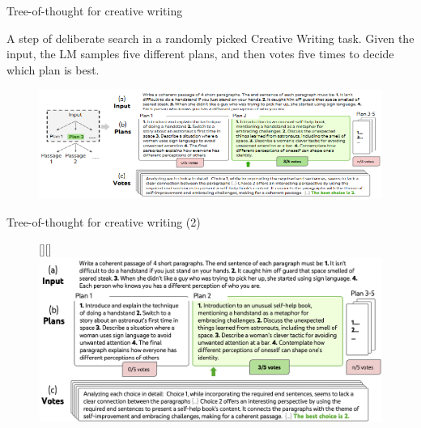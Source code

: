 

\begin{vbframe}{Tree-of-thought for creative writing}

\vfill

A step of deliberate search in a randomly picked Creative Writing task. Given the input, the LM samples five different plans, and then votes five times to decide which plan is best.
    
\begin{figure}
    \centering
    \includegraphics{figure/tot_creative_writing.png}\\
\end{figure}

\vfill

\end{vbframe}

\begin{vbframe}{Tree-of-thought for creative writing (2)}

\vfill
    
\begin{figure}
    \raisebox{0pt}[\height][\depth]{\hspace{-0.85cm}%
        \includegraphics[width=1.15\textwidth]{figure/totcreativebig.png}}
\end{figure}

\vfill

\end{vbframe}


\endlecture

